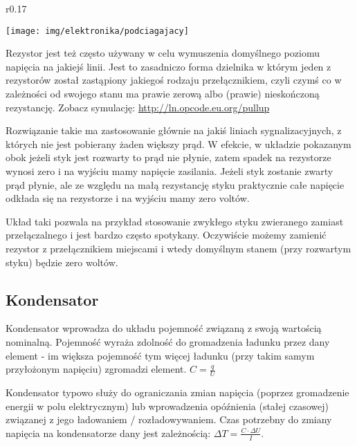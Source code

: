 \begin{wrapfigure}{r}{0.17\textwidth}
  \begin{center}
    \vspace{-40pt}
    \texttt{[image: img/elektronika/podciagajacy]}
    \vspace{-20pt}
  \end{center}
\end{wrapfigure}

Rezystor jest też często używany w celu wymuszenia domyślnego poziomu napięcia na jakiejś linii.
Jest to zasadniczo forma dzielnika w którym jeden z rezystorów został zastąpiony jakiegoś rodzaju przełącznikiem, czyli czymś co w zależności od swojego stanu ma prawie zerową albo (prawie) nieskończoną rezystancję.
Zobacz symulację: \url{http://ln.opcode.eu.org/pullup}

Rozwiązanie takie ma zastosowanie głównie na jakiś liniach sygnalizacyjnych, z których nie jest pobierany żaden większy prąd.
W efekcie, w układzie pokazanym obok jeżeli styk jest rozwarty to prąd nie płynie, zatem spadek na rezystorze wynosi zero i na wyjściu mamy napięcie zasilania.
Jeżeli styk zostanie zwarty prąd płynie, ale ze względu na małą rezystancję styku praktycznie całe napięcie odkłada się na rezystorze i na wyjściu mamy zero voltów.

Układ taki pozwala na przykład stosowanie zwykłego styku zwieranego zamiast przełączalnego i jest bardzo często spotykany.
Oczywiście możemy zamienić rezystor z przełącznikiem miejscami i wtedy domyślnym stanem (przy rozwartym styku) będzie zero woltów.


\subsection{Kondensator}

Kondensator wprowadza do układu pojemność związaną z swoją wartością nominalną.
Pojemność wyraża zdolność do gromadzenia ładunku przez dany element - im większa pojemność tym więcej ładunku (przy takim samym przyłożonym napięciu) zgromadzi element. $C = \frac{q}{U}$

Kondensator typowo służy do ograniczania zmian napięcia (poprzez gromadzenie energii w polu elektrycznym) lub wprowadzenia opóźnienia (stałej czasowej) związanej z jego ładowaniem / rozładowywaniem.
Czas potrzebny do zmiany napięcia na kondensatorze dany jest zależnością: $\Delta T = \frac{C \cdot \Delta U}{I}$.

